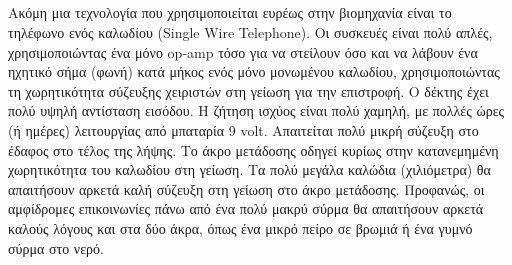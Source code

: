     \subsection{}
        Ακόμη μια τεχνολογία που χρησιμοποιείται ευρέως στην βιομηχανία είναι το τηλέφωνο
        ενός καλωδίου (Single Wire Telephone). Οι συσκευές είναι πολύ απλές, χρησιμοποιώντας
        ένα μόνο op-amp τόσο για να στείλουν όσο και να λάβουν ένα ηχητικό σήμα (φωνή) κατά
        μήκος ενός μόνο μονωμένου καλωδίου, χρησιμοποιώντας τη χωρητικότητα σύζευξης χειριστών
        στη γείωση για την επιστροφή. Ο δέκτης έχει πολύ υψηλή αντίσταση εισόδου. Η ζήτηση
        ισχύος είναι πολύ χαμηλή, με πολλές ώρες (ή ημέρες) λειτουργίας από μπαταρία 9 volt.
        Απαιτείται πολύ μικρή σύζευξη στο έδαφος στο τέλος της λήψης. Το άκρο μετάδοσης οδηγεί
        κυρίως στην κατανεμημένη χωρητικότητα του καλωδίου στη γείωση. Τα πολύ μεγάλα καλώδια
        (χιλιόμετρα) θα απαιτήσουν αρκετά καλή σύζευξη στη γείωση στο άκρο μετάδοσης.
        Προφανώς, οι αμφίδρομες επικοινωνίες πάνω από ένα πολύ μακρύ σύρμα θα απαιτήσουν
        αρκετά καλούς λόγους και στα δύο άκρα, όπως ένα μικρό πείρο σε βρωμιά ή ένα γυμνό
        σύρμα στο νερό.